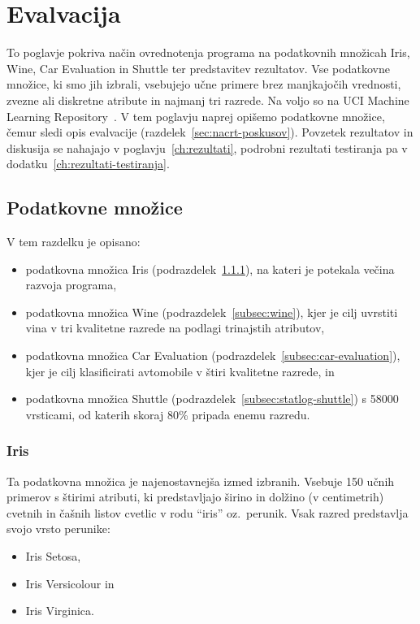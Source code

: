 \documentclass[a4paper,12pt,openright]{book}
\begin{document}
    \chapter{Evalvacija}\label{ch:evalvacija}
    To poglavje pokriva način ovrednotenja programa na podatkovnih množicah Iris, Wine, Car Evaluation in Shuttle ter predstavitev rezultatov.
    Vse podatkovne množice, ki smo jih izbrali, vsebujejo učne primere brez manjkajočih vrednosti, zvezne ali diskretne atribute in najmanj tri razrede.
    Na voljo so na UCI Machine Learning Repository~\cite{uci}.
    V tem poglavju naprej opišemo podatkovne množice, čemur sledi opis evalvacije (razdelek~\ref{sec:nacrt-poskusov}).
    Povzetek rezultatov in diskusija se nahajajo v poglavju~\ref{ch:rezultati}, podrobni rezultati testiranja pa v dodatku~\ref{ch:rezultati-testiranja}.

    \newpage
    \section{Podatkovne množice}\label{sec:podatkovne-mnozice}
    V tem razdelku je opisano:
    \begin{itemize}
        \item podatkovna množica Iris (podrazdelek~\ref{subsec:iris}), na kateri je potekala večina razvoja programa,
        \item podatkovna množica Wine (podrazdelek~\ref{subsec:wine}), kjer je cilj uvrstiti vina v tri kvalitetne razrede na podlagi trinajstih atributov,
        \item podatkovna množica Car Evaluation (podrazdelek~\ref{subsec:car-evaluation}), kjer je cilj klasificirati avtomobile v štiri kvalitetne razrede, in
        \item podatkovna množica Shuttle (podrazdelek~\ref{subsec:statlog-shuttle}) s 58000 vrsticami, od katerih skoraj 80\% pripada enemu razredu.
    \end{itemize}

    \subsection{Iris}\label{subsec:iris}
    Ta podatkovna množica je najenostavnejša izmed izbranih.
    Vsebuje 150 učnih primerov s štirimi atributi, ki predstavljajo širino in dolžino (v centimetrih) cvetnih in čašnih
    listov cvetlic v rodu \enquote{iris} oz.\ perunik.
    Vsak razred predstavlja svojo vrsto perunike:
    \begin{itemize}
        \item Iris Setosa,
        \item Iris Versicolour in
        \item Iris Virginica.
    \end{itemize}
\end{document}
